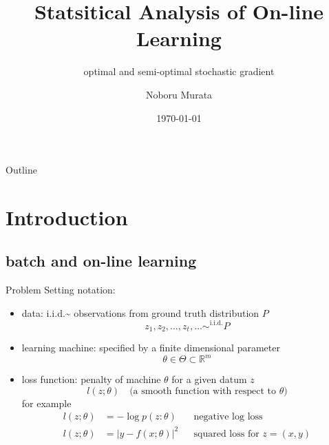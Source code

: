 \documentclass[fleqn,aspectratio=1610]{beamer}
\author{Noboru Murata}
\date{\today}
\title{Statsitical Analysis of On-line Learning}
\subtitle{optimal and semi-optimal stochastic gradient}
\institute{\url{https://noboru-murata.github.io/}}
\begin{document}
\maketitle
\begin{frame}{Outline}
\tableofcontents
\end{frame}


\section{Introduction}
\label{sec:org533e85f}
\subsection{batch and on-line learning}
\label{sec:org5f1afef}
\begin{frame}[label={sec:orgd4bcc3a}]{Problem Setting}
notation:
\begin{itemize}
\item data: 
i.i.d.\textasciitilde{} observations from ground truth distribution \(P\)
\begin{equation}
  z_{1},z_{2},\dotsc,z_{t},\dotsc \sim^{\mathrm{i.i.d.}} P 
\end{equation}
\item learning machine:
specified by a finite dimensional parameter
\begin{equation}
  \theta \in \Theta\subset \mathbb{R}^{m}
\end{equation}
\item loss function:
penalty of machine \(\theta\) for a given datum \(z\) 
\begin{equation}
  l(z;\theta)
  \quad\text{(a smooth function with respect to \(\theta\))}
\end{equation}
for example
\begin{align}
  l(z;\theta)&=-\log p(z:\theta)
  &&\text{negative log loss}\\[-2pt]
  l(z;\theta)&=|y-f(x;\theta)|^{2}
  &&\text{squared loss for \(z=(x,y)\)}
\end{align}
\end{itemize}
\end{frame}
\end{document}
